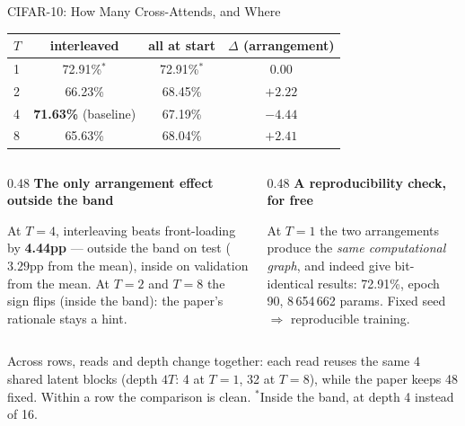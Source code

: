 \documentclass[aspectratio=169,11pt]{beamer}
\newcommand{\colhead}[1]{{\color{HeadBlue}\bfseries #1}\par\vspace{0.25em}}
\begin{document}
\begin{frame}[shrink=5]{CIFAR-10: How Many Cross-Attends, and Where}
  \begin{table}
    \centering\small
    \begin{tabular}{lccc}
      \toprule
      \textbf{$T$} & \textbf{interleaved} & \textbf{all at start} & \textbf{$\Delta$ (arrangement)} \\
      \midrule
      1 & 72.91\%$^{*}$ & 72.91\%$^{*}$ & $0.00$ \\
      2 & 66.23\% & 68.45\% & $+2.22$ \\
      4 & \textbf{71.63\%} \tiny(baseline) & 67.19\% & \textcolor{AccentRed}{$\mathbf{-4.44}$} \\
      8 & 65.63\% & 68.04\% & $+2.41$ \\
      \bottomrule
    \end{tabular}
  \end{table}

  \vspace{0.3em}
  \begin{columns}[T]
    \begin{column}{0.48\textwidth}
      \colhead{The only arrangement effect outside the band}
        \small
        At $T=4$, interleaving beats front-loading by \textbf{4.44pp} --- outside the band on test ($3.29$pp from the mean), inside on validation from the mean. At $T=2$ and $T=8$ the sign flips (inside the band): the paper's rationale stays a hint.
      
    \end{column}
    \begin{column}{0.48\textwidth}
      \colhead{A reproducibility check, for free}
        \small
        At $T=1$ the two arrangements produce the \emph{same computational graph}, and indeed give bit-identical results: 72.91\%, epoch 90, 8\,654\,662 params. Fixed seed $\Rightarrow$ reproducible training.
      
    \end{column}
  \end{columns}

  \vspace{0.2em}
  \scriptsize Across rows, reads and depth change together: each read reuses the same 4 shared latent blocks (depth $4T$: 4 at $T=1$, 32 at $T=8$), while the paper keeps 48 fixed. Within a row the comparison is clean. $^{*}$Inside the band, at depth 4 instead of 16.
\end{frame}
\end{document}
